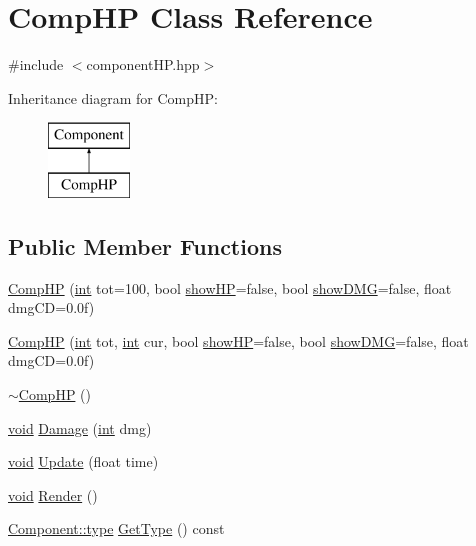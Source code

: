 \hypertarget{class_comp_h_p}{\section{Comp\-H\-P Class Reference}
\label{class_comp_h_p}
}


{\ttfamily \#include $<$component\-H\-P.\-hpp$>$}

Inheritance diagram for Comp\-H\-P\-:\begin{figure}[H]
\begin{center}
\leavevmode
\includegraphics[height=2.000000cm]{class_comp_h_p}
\end{center}
\end{figure}
\subsection*{Public Member Functions}
\begin{DoxyCompactItemize}
\item 
\hyperlink{class_comp_h_p_aeb0ef6fb592a3fb40777f1cc4b9603fb}{Comp\-H\-P} (\hyperlink{_s_d_l__thread_8h_a6a64f9be4433e4de6e2f2f548cf3c08e}{int} tot=100, bool \hyperlink{class_comp_h_p_a19b9aed1c306f6d4f083343a346245bd}{show\-H\-P}=false, bool \hyperlink{class_comp_h_p_a91b1dfaf9488d5402e4a6db7384f0732}{show\-D\-M\-G}=false, float dmg\-C\-D=0.\-0f)
\item 
\hyperlink{class_comp_h_p_a56cd5967f1e9249800ec4ba1503b7bb4}{Comp\-H\-P} (\hyperlink{_s_d_l__thread_8h_a6a64f9be4433e4de6e2f2f548cf3c08e}{int} tot, \hyperlink{_s_d_l__thread_8h_a6a64f9be4433e4de6e2f2f548cf3c08e}{int} cur, bool \hyperlink{class_comp_h_p_a19b9aed1c306f6d4f083343a346245bd}{show\-H\-P}=false, bool \hyperlink{class_comp_h_p_a91b1dfaf9488d5402e4a6db7384f0732}{show\-D\-M\-G}=false, float dmg\-C\-D=0.\-0f)
\item 
\hyperlink{class_comp_h_p_a5d90002f92e3fbdbb37dc16b468165ea}{$\sim$\-Comp\-H\-P} ()
\item 
\hyperlink{_s_d_l__opengles2__gl2ext_8h_ae5d8fa23ad07c48bb609509eae494c95}{void} \hyperlink{class_comp_h_p_a7c3a36ab0d8b75c24517e16600057dda}{Damage} (\hyperlink{_s_d_l__thread_8h_a6a64f9be4433e4de6e2f2f548cf3c08e}{int} dmg)
\item 
\hyperlink{_s_d_l__opengles2__gl2ext_8h_ae5d8fa23ad07c48bb609509eae494c95}{void} \hyperlink{class_comp_h_p_addbc7227df2932a60af577a1da7ff7a5}{Update} (float time)
\item 
\hyperlink{_s_d_l__opengles2__gl2ext_8h_ae5d8fa23ad07c48bb609509eae494c95}{void} \hyperlink{class_comp_h_p_a81565c18ea23d7e67cfeccecad45fdd9}{Render} ()
\item 
\hyperlink{class_component_ad6d161b6acf7b843b55bb9feac7af71a}{Component\-::type} \hyperlink{class_comp_h_p_a0fd0311386f7029e9b5cc49742fce649}{Get\-Type} () const 
\end{DoxyCompactItemize}
